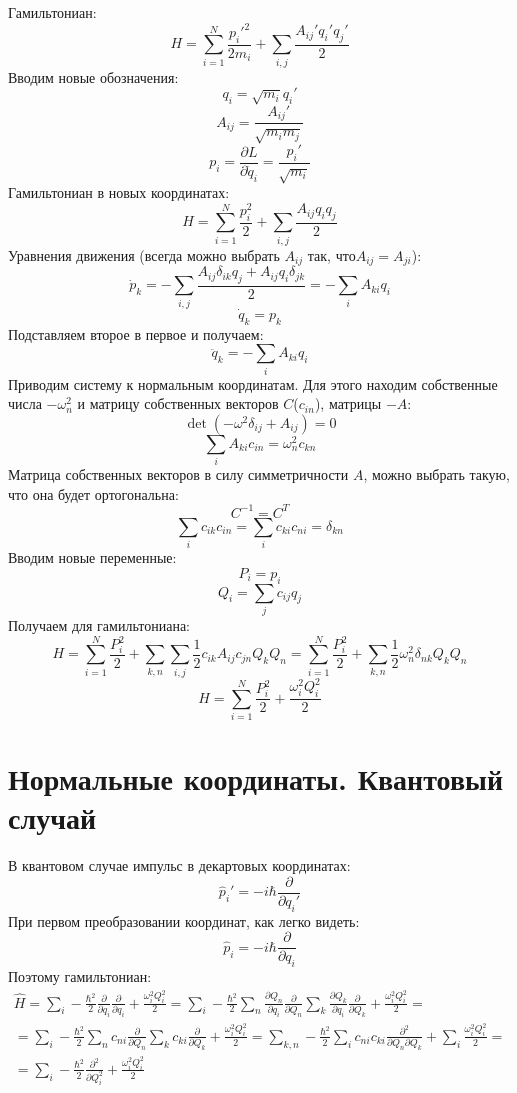 Гамильтониан:
\[
	H = \sum_{i=1}^{N} \frac{p_i'^2}{2m_i} + \sum_{i,j} \frac{A_{ij}' q_i' q_j'}{2}
\]
Вводим новые обозначения:
\[
	q_i = \sqrt{m_i} q_i' 
\]
\[
	A_{ij} = \frac{A_{ij}'}{\sqrt{m_i m_j}}
\]
\[
	p_i = \frac{\partial L}{\partial \dot{q}_i} = \frac{p_i'}{\sqrt{m_i}}
\]
Гамильтониан в новых координатах:
\[
	H = \sum_{i=1}^{N} \frac{p_i^2}{2} + \sum_{i,j} \frac{A_{ij} q_i q_j}{2}
\]
Уравнения движения (всегда можно выбрать $A_{ij}$ так, что$A_{ij} = A_{ji}$):
\[
	\dot{p}_k = -\sum_{i,j} \frac{A_{ij} \delta_{ik} q_j + A_{ij} q_i \delta_{jk}}{2} = -\sum_i A_{ki} q_i 
\]
\[
	\dot{q}_k = p_k
\]
Подставляем второе в первое и получаем:
\[
	\ddot{q}_k = -\sum_i A_{ki} q_i 
\]
Приводим систему к нормальным координатам. Для этого находим собственные числа $-\omega_n^2$ и матрицу собственных векторов $C$($c_{in}$), матрицы $-A$:
\[
	\det (- \omega^2 \delta_{ij} + A_{ij}) = 0
\]
\[
	\sum_{i} A_{ki} c_{in} = \omega_n^2 c_{kn}
\]
Матрица собственных векторов в силу симметричности $A$, можно выбрать такую, что она будет ортогональна:
\[
	C^{-1} = C^T
\]
\[
	\sum_i c_{ik} c_{in} = \sum_i c_{ki} c_{ni} = \delta_{kn}
\]
Вводим новые переменные:
\[
	P_i = p_i
\]
\[
	Q_i = \sum_j c_{ij} q_j
\]
Получаем для гамильтониана:
\[
	H = 
	\sum_{i=1}^{N} \frac{P_i^2}{2} + \sum_{k,n}\sum_{i,j} \frac{1}{2} c_{ik} A_{ij} c_{jn} Q_k Q_n = 
	\sum_{i=1}^{N} \frac{P_i^2}{2} + \sum_{k,n} \frac{1}{2} \omega_n^2 \delta_{nk} Q_k Q_n
\]
\[
	H = \sum_{i=1}^{N} \frac{P_i^2}{2} + \frac{\omega_i^2 Q_i^2}{2}
\]

\section{Нормальные координаты. Квантовый случай}
В квантовом случае импульс в декартовых координатах:
\[
	\hat{p}_i' = - i\hbar \frac{\partial}{\partial q_i'}
\]
При первом преобразовании координат, как легко видеть:
\[
	\hat{p}_i = - i\hbar \frac{\partial}{\partial q_i}
\]
Поэтому гамильтониан:
\[
	\begin{gathered}
	\hat{H} = 
	\sum_{i} - \frac{\hbar^2}{2} \frac{\partial}{\partial q_i} \frac{\partial}{\partial q_i} + \frac{\omega_i^2 Q_i^2}{2} = 
	\sum_{i} - \frac{\hbar^2}{2} \sum_n\frac{\partial Q_n}{\partial q_i} \frac{\partial}{\partial Q_n} \sum_k\frac{\partial Q_k}{\partial q_i} \frac{\partial}{\partial Q_k}  + \frac{\omega_i^2 Q_i^2}{2} =
	\\ =
	\sum_{i} - \frac{\hbar^2}{2} \sum_n c_{ni} \frac{\partial}{\partial Q_n} \sum_k c_{ki} \frac{\partial}{\partial Q_k}  + \frac{\omega_i^2 Q_i^2}{2} =
	\sum_{k, n} - \frac{\hbar^2}{2} \sum_{i} c_{ni} c_{ki} \frac{\partial^2}{\partial Q_n \partial Q_k} +
	\sum_{i} \frac{\omega_i^2 Q_i^2}{2} =
	\\ =
	\sum_{i} - \frac{\hbar^2}{2} \frac{\partial^2}{\partial Q_i^2} + \frac{\omega_i^2 Q_i^2}{2}
	\end{gathered}
\]
